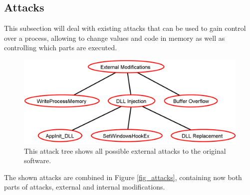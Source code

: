 \subsection{Attacks}
This subsection will deal with existing attacks that can be used to gain control over a process, allowing to change values and code in memory as well as controlling which parts are executed. 
\begin{figure}[h]
\centering
\includegraphics[scale=0.35]{sections/adtrees/ExternalModificationsWithoutDefenses.png}
\caption{This attack tree shows all possible external attacks to the original software.}
\label{fig:attacks_external}
\end{figure}




The shown attacks are combined in Figure \ref{fig_attacks}, containing now both parts of attacks, external and internal modifications.
